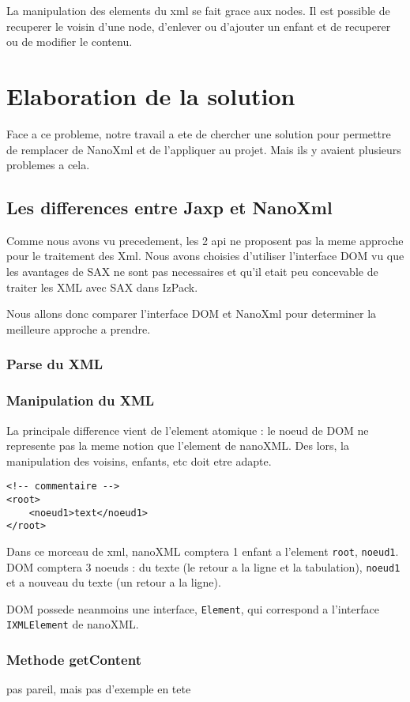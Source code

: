 La manipulation des elements du xml se fait grace aux nodes. Il est possible de recuperer le voisin d'une node, d'enlever ou d'ajouter un enfant et de recuperer ou de modifier le contenu.
\section{Elaboration de la solution}
Face a ce probleme, notre travail a ete de chercher une solution pour permettre de remplacer de NanoXml et de l'appliquer au projet. Mais ils y avaient plusieurs problemes a cela.
\subsection{Les differences entre Jaxp et NanoXml}
Comme nous avons vu precedement, les 2 api ne proposent pas la meme approche pour le traitement des Xml. Nous avons choisies d'utiliser l'interface DOM vu que les avantages de SAX ne sont pas necessaires et qu'il etait peu concevable de traiter les XML avec SAX dans IzPack.

Nous allons donc comparer l'interface DOM et NanoXml pour determiner la meilleure approche a prendre.
\subsubsection{Parse du XML}

\subsubsection{Manipulation du XML}
La principale difference vient de l'element atomique : le noeud de DOM ne represente pas la meme notion que l'element de nanoXML. Des lors, la manipulation des voisins, enfants, etc doit etre adapte.
\begin{verbatim}
<!-- commentaire -->
<root>
	<noeud1>text</noeud1>
</root>
\end{verbatim}
Dans ce morceau de xml, nanoXML comptera 1 enfant a l'element \verb|root|, \verb|noeud1|. DOM comptera 3 noeuds : du texte (le retour a la ligne et la tabulation), \verb|noeud1| et a nouveau du texte (un retour a la ligne).

DOM possede neanmoins une interface, \verb|Element|, qui correspond a l'interface \verb|IXMLElement| de nanoXML.

\subsubsection{Methode getContent}
pas pareil, mais pas d'exemple en tete

